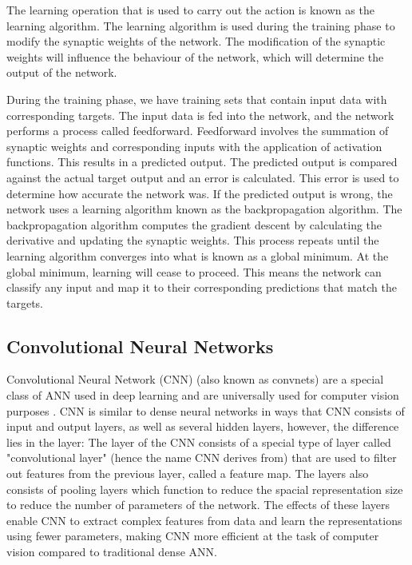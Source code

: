 The learning operation that is used to carry out the action is known as the learning algorithm. The learning algorithm is used during the training phase to modify the synaptic weights of the network. The modification of the synaptic weights will influence the behaviour of the network, which will determine the output of the network.



During the training phase, we have training sets that contain input data with corresponding targets. The input data is fed into the network, and the network performs a process called feedforward. Feedforward involves the summation of synaptic weights and corresponding inputs with the application of activation functions. This results in a predicted output. The predicted output is compared against the actual target output and an error is calculated. This error is used to determine how accurate the network was. If the predicted output is wrong, the network uses a learning algorithm known as the backpropagation algorithm. The backpropagation algorithm computes the gradient descent by calculating the derivative and updating the synaptic weights. This process repeats until the learning algorithm converges into what is known as a global minimum. At the global minimum, learning will cease to proceed. This means the network can classify any input and map it to their corresponding predictions that match the targets.




\subsection*{Convolutional Neural Networks}
Convolutional Neural Network (CNN) (also known as convnets) are a special class of ANN used in deep learning and are universally used for computer vision purposes \cite{enwiki:1085146109}. CNN is similar to dense neural networks in ways that CNN consists of input and output layers, as well as several hidden layers, however, the difference lies in the layer: The layer of the CNN consists of a special type of layer called "convolutional layer" (hence the name CNN derives from) that are used to filter out features from the previous layer, called a feature map. The layers also consists of pooling layers which function to reduce the spacial representation size to reduce the number of parameters of the network. The effects of these layers enable CNN to extract complex features from data and learn the representations using fewer parameters, making CNN more efficient at the task of computer vision compared to traditional dense ANN. 

